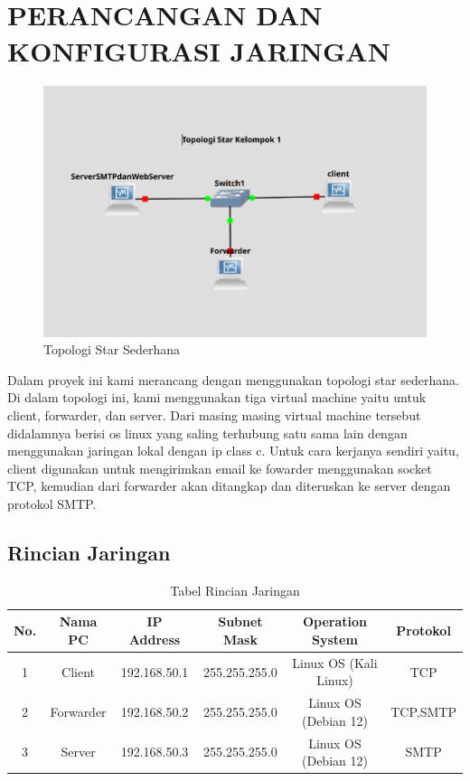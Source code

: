 \documentclass[12pt, a4paper]{article}
\begin{document}
\pagebreak
\section{\centering\\PERANCANGAN DAN KONFIGURASI JARINGAN}
  \begin{figure}[h]
    \centering
    \includegraphics[width=12cm]{topologi.png}
    \caption{Topologi Star Sederhana}
    \label{fig:topologi}
  \end{figure}
\begin{adjustwidth}{1.4cm}{0cm}
\quad\quad Dalam proyek ini kami merancang dengan menggunakan topologi star sederhana. Di dalam topologi ini, kami menggunakan tiga virtual machine yaitu untuk client, forwarder, dan server. Dari masing masing virtual machine tersebut didalamnya berisi os linux yang saling terhubung satu sama lain dengan menggunakan jaringan lokal dengan ip class c. Untuk cara kerjanya sendiri yaitu, client digunakan untuk mengirimkan email ke fowarder menggunakan socket TCP, kemudian dari forwarder akan ditangkap dan diteruskan ke server dengan protokol SMTP.
\end{adjustwidth}
\subsection{Rincian Jaringan}

\begin{table}[h]
\centering
\begin{tabular}{|c|c|c|c|c|c|}
\hline
No. & Nama PC & IP Address & Subnet Mask & Operation System & Protokol \\ \hline
1   & Client  & 192.168.50.1 & 255.255.255.0 & Linux OS (Kali Linux) & TCP \\ \hline
2   & Forwarder & 192.168.50.2 & 255.255.255.0 & Linux OS (Debian 12) & TCP,SMTP \\ \hline
3   & Server  & 192.168.50.3 & 255.255.255.0 & Linux OS (Debian 12) & SMTP \\ \hline
\end{tabular}
\caption{Tabel Rincian Jaringan}
\end{table}
\pagebreak
\end{document}
